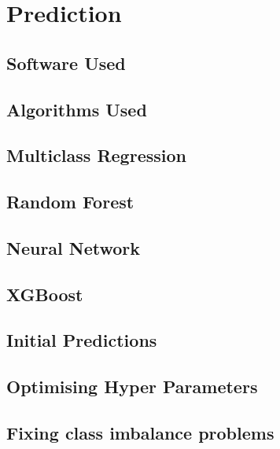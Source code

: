 \chapter{Prediction}

\section{Software Used}

\section{Algorithms Used}
\section{Multiclass Regression}
\section{Random Forest}
\section{Neural Network}
\section{XGBoost}

\section{Initial Predictions}

\section{Optimising Hyper Parameters}

\section{Fixing class imbalance problems}